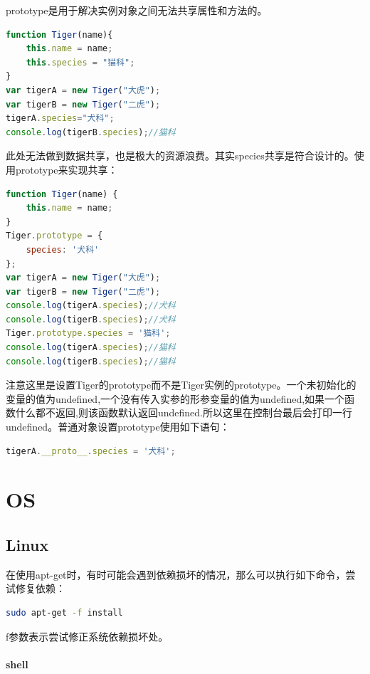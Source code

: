 \documentclass[letter]{book}
\begin{document}
prototype是用于解决实例对象之间无法共享属性和方法的。

\begin{lstlisting}[language=Javascript]
function Tiger(name){
	this.name = name;
	this.species = "猫科";
}
var tigerA = new Tiger("大虎");
var tigerB = new Tiger("二虎");
tigerA.species="犬科";
console.log(tigerB.species);//猫科
\end{lstlisting}

此处无法做到数据共享，也是极大的资源浪费。其实species共享是符合设计的。使用prototype来实现共享：

\begin{lstlisting}[language=Javascript]
function Tiger(name) {
	this.name = name;
}
Tiger.prototype = {
	species: '犬科'
};
var tigerA = new Tiger("大虎");
var tigerB = new Tiger("二虎");
console.log(tigerA.species);//犬科
console.log(tigerB.species);//犬科
Tiger.prototype.species = '猫科';
console.log(tigerA.species);//猫科
console.log(tigerB.species);//猫科
\end{lstlisting}

注意这里是设置Tiger的prototype而不是Tiger实例的prototype。一个未初始化的变量的值为undefined,一个没有传入实参的形参变量的值为undefined,如果一个函数什么都不返回,则该函数默认返回undefined.所以这里在控制台最后会打印一行undefined。普通对象设置prototype使用如下语句：

\begin{lstlisting}[language=Javascript]
tigerA.__proto__.species = '犬科';
\end{lstlisting}


\part{OS}

\chapter{Linux}

在使用apt-get时，有时可能会遇到依赖损坏的情况，那么可以执行如下命令，尝试修复依赖：

\begin{lstlisting}[language=Bash]
sudo apt-get -f install 
\end{lstlisting}

f参数表示尝试修正系统依赖损坏处。

\subsection{shell}
\end{document}
